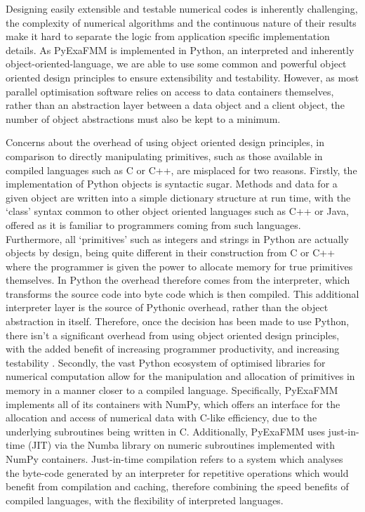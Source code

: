 Designing easily extensible and testable numerical codes is inherently challenging,
the complexity of numerical algorithms and the continuous nature of their results
make it hard to separate the logic from application specific implementation details.
As \gls{PyExaFMM} is implemented in Python, an \gls{interpreted} and inherently
\gls{object-oriented-language}, we are able to
use some common and powerful object oriented design principles to ensure extensibility
and testability. However, as most parallel optimisation software relies on access to data
containers themselves, rather than an abstraction layer between a data object
and a client object, the number of object abstractions must also be kept to a
minimum.

Concerns about the overhead of using object oriented design principles, in comparison to directly manipulating
primitives, such as those available in compiled languages such as C
or C++, are misplaced for two reasons. Firstly, the implementation of Python objects
is syntactic sugar. Methods and data for a given object are written into
a simple dictionary structure at run time, with the `class' syntax common to other
object oriented languages such as C++ or Java, offered as it is familiar to
programmers coming from such languages. Furthermore, all `primitives' such as
integers and strings in Python are actually objects by design, being quite different
in their construction from C or C++ where the programmer is given the power to
allocate memory for true primitives themselves. In Python the overhead therefore
comes from the interpreter, which transforms the source code into byte code which
is then compiled. This additional interpreter layer is the source of Pythonic overhead,
rather than the object abstraction in itself. Therefore, once the decision has
been made to use Python, there isn't a significant overhead from using object
oriented design principles, with the added benefit of increasing programmer
productivity, and increasing testability \cite{Ramalho:2015:Oreilly}. Secondly,
the vast Python ecosystem of optimised libraries for numerical computation allow
for the manipulation and allocation of primitives in memory in a manner closer to a compiled language.
Specifically, \gls{PyExaFMM} implements all of its containers with NumPy, which
offers an interface for the allocation and access of numerical data with C-like
efficiency, due to the underlying subroutines being written in C. Additionally,
\gls{PyExaFMM} uses just-in-time (\gls{JIT}) via the Numba library on
numeric subroutines implemented with NumPy containers. Just-in-time compilation
refers to a system which analyses the byte-code generated by an interpreter
for repetitive operations which would benefit from compilation and caching, therefore
combining the speed benefits of compiled languages, with the flexibility of interpreted
languages.

